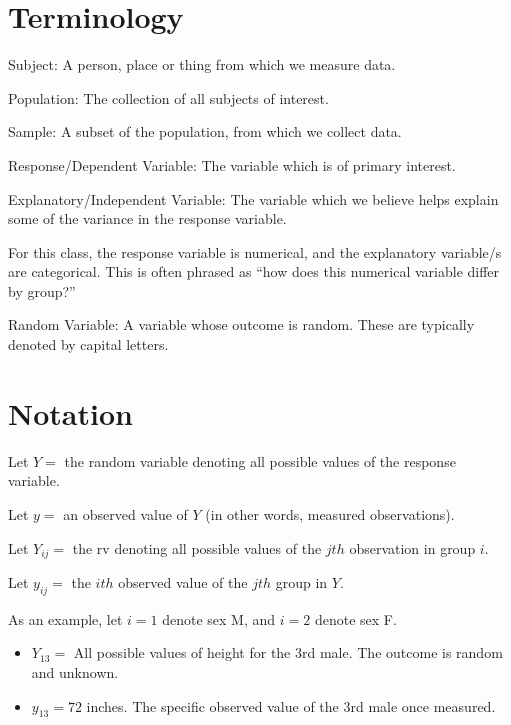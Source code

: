 \documentclass[10pt]{article}
\newcommand{\define}[1]{\colorbox{Thistle2}{#1}}
\newcommand{\emphas}[1]{\colorbox{DarkSeaGreen2}{#1}}
\begin{document}
\begin{multicols}{3}



    \tableofcontents

    \section{Terminology}

    \define{Subject}: A person, place or thing from which we measure data.

    \define{Population}: The collection of all subjects of interest.

    \define{Sample}: A subset of the population, from which we collect data.

    \define{Response/Dependent Variable}: The variable which is of primary interest.

    \define{Explanatory/Independent Variable}: The variable which we believe helps explain some of the variance in the response variable.

    For this class, the response variable is \emphas{numerical}, and the explanatory variable/s are \emphas{categorical}. This is often phrased as ``how does this numerical variable differ by group?''

    \define{Random Variable}: A variable whose outcome is random. These are typically denoted by capital letters.

    \section{Notation}

    Let $Y =$ the random variable denoting all possible values of the response variable.

    Let $y =$ an observed value of $Y$ (in other words, measured observations).

    Let $Y_{ij}=$ the rv denoting all possible values of the $jth$ observation in group $i$.

    Let $y_{ij}=$ the $ith$ observed value of the $jth$ group in $Y$.

    As an example, let $i=1$ denote sex M, and $i=2$ denote sex F.

    \begin{itemize}
        \item $Y_{13}=$ All possible values of height for the 3rd male. The outcome is random and unknown.
        \item $y_{13}= 72$ inches. The specific observed value of the 3rd male once measured.
    \end{itemize}


\end{multicols}
\end{document}
